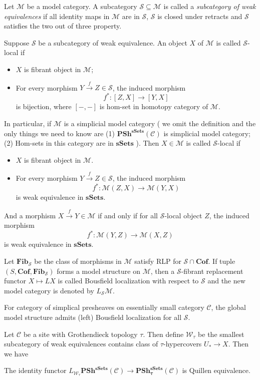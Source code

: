 \documentclass[b5paper,10pt]{article}
\begin{document}
Let $\mathcal{M}$ be a model category. A subcategory $\mathcal{S} \subseteq \mathcal{M}$ is called 
a \emph{subcategory of weak equivalences} if all identity maps in $\mathcal{M}$ are in $\mathcal{S}$, $\mathcal{S}$ is closed under retracts and $\mathcal{S}$ satisfies the two out of three property.
\begin{secdefn}
	Suppose $\mathcal{S}$ be a subcategory of weak equivalence. An object $X$ of $\mathcal{M}$ is called $\mathcal{S}$-local if 
	\begin{itemize}
		\item $X$ is fibrant object in $\mathcal{M}$;
		\item  For every morphism $Y \xrightarrow{f} Z \in \mathcal{S}$, the induced morphism 
		\[
		f^* \colon [Z,X] \to [Y,X]
		\]
		is bijection, where $[-,-]$ is hom-set in homotopy category of $\mathcal{M}$.
	\end{itemize}
\end{secdefn}
In particular, if $\mathcal{M}$ is a simplicial model category ( we omit the definition and the only things we need to know are (1) $\mathbf{PSh^{sSets}}(\mathcal{C})$ is simplicial model category; (2) Hom-sets in this category are in $\mathbf{sSets}$
 ). Then $X\in \mathcal{M}$ is called $\mathcal{S}$-local if 
 \begin{itemize}
 	\item $X$ is fibrant object in $\mathcal{M}$.
 	\item For every morphism $Y \xrightarrow{f} Z \in \mathcal{S}$, the induced morphism
 	\[
 	f^* \colon \mathcal{M}(Z,X) \to \mathcal{M}(Y,X)
 	\]
 	is weak equivalence in $\mathbf{sSets}$.
 \end{itemize}
And a morphism $X \xrightarrow{f} Y \in \mathcal{M}$ if and only if for all $\mathcal{S}$-local object $Z$, the induced morphism
\[
f^* \colon \mathcal{M}(Y,Z) \to \mathcal{M}(X,Z) 
\]
is weak equivalence in $\mathbf{sSets}$.
\begin{secdefn} Let $\mathbf{Fib}_{\mathcal{S}}$ be the class of morphisms in $\mathcal{M}$ satisfy RLP for $\mathcal{S} \cap \mathbf{Cof}$.
	If tuple $(S,\mathbf{Cof},\mathbf{Fib}_\mathcal{S})$ forms a model structure on $\mathcal{M}$, then a $\mathcal{S}$-fibrant replacement functor $ X \mapsto LX$ is called Bousfield localization with respect to $\mathcal{S}$ and the new model category is denoted by $L_\mathcal{S} \mathcal{M}$.
\end{secdefn}
\begin{secthm}
	For category of simplical presheaves on essentially small category $\mathcal{C}$, the global model structure admits (left) Bousfield localization for all $\mathcal{S}$.
\end{secthm}
Let $\mathcal{C}$ be a site with Grothendieck topology $\tau$. Then define $\mathcal{W}_\tau$ be the smallest subcategory of weak equivalences contains class of $\tau$-hypercovers $U_* \to X$. Then we have
\begin{secthm}
	The identity functor $L_{\mathcal{W}_\tau} \mathbf{PSh^{sSets}}(\mathcal{C}) \to \mathbf{PSh^{sSets}_\tau}(\mathcal{C})$ is Quillen equivalence.
\end{secthm}
\end{document}
